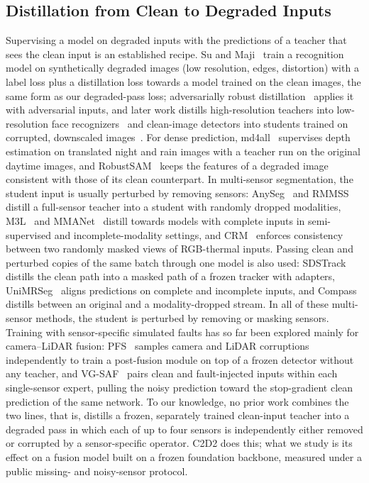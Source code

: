 \subsection{Distillation from Clean to Degraded Inputs}
Supervising a model on degraded inputs with the predictions of a teacher that sees the clean input is an established recipe. Su and Maji~\cite{su2017cqd} train a recognition model on synthetically degraded images (low resolution, edges, distortion) with a label loss plus a distillation loss towards a model trained on the clean images, the same form as our degraded-pass loss; adversarially robust distillation~\cite{goldblum2020ard} applies it with adversarial inputs, and later work distills high-resolution teachers into low-resolution face recognizers~\cite{shin2022askd} and clean-image detectors into students trained on corrupted, downscaled images~\cite{lee2026cdfkd}. For dense prediction, md4all~\cite{gasperini2023md4all} supervises depth estimation on translated night and rain images with a teacher run on the original daytime images, and RobustSAM~\cite{chen2024robustsam} keeps the features of a degraded image consistent with those of its clean counterpart. In multi-sensor segmentation, the student input is usually perturbed by removing sensors: AnySeg~\cite{anyseg2024} and RMMSS~\cite{rmmss2025} distill a full-sensor teacher into a student with randomly dropped modalities, M3L~\cite{maheshwari2023m3l} and MMANet~\cite{wei2023mmanet} distill towards models with complete inputs in semi-supervised and incomplete-modality settings, and CRM~\cite{shin2024crm} enforces consistency between two randomly masked views of RGB-thermal inputs. Passing clean and perturbed copies of the same batch through one model is also used: SDSTrack~\cite{hou2024sdstrack} distills the clean path into a masked path of a frozen tracker with adapters, UniMRSeg~\cite{zhao2025unimrseg} aligns predictions on complete and incomplete inputs, and Compass~\cite{liu2026compass} distills between an original and a modality-dropped stream. In all of these multi-sensor methods, the student is perturbed by removing or masking sensors. Training with sensor-specific simulated faults has so far been explored mainly for camera--LiDAR fusion: PFS~\cite{dong2026pfs} samples camera and LiDAR corruptions independently to train a post-fusion module on top of a frozen detector without any teacher, and VG-SAF~\cite{tao2026vgsaf} pairs clean and fault-injected inputs within each single-sensor expert, pulling the noisy prediction toward the stop-gradient clean prediction of the same network. To our knowledge, no prior work combines the two lines, that is, distills a frozen, separately trained clean-input teacher into a degraded pass in which each of up to four sensors is independently either removed or corrupted by a sensor-specific operator. C2D2 does this; what we study is its effect on a fusion model built on a frozen foundation backbone, measured under a public missing- and noisy-sensor protocol.

